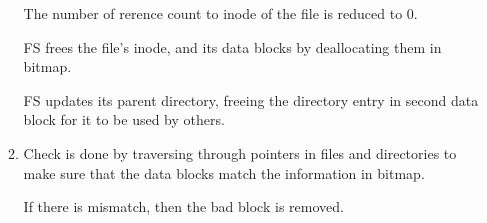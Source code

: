 \documentclass[12pt]{article}
\begin{document}
\begin{enumerate}[1.]
\begin{enumerate}[1)]
        The number of rerence count to inode of the file is reduced to 0.

        \bigskip

        FS frees the file's inode, and its data blocks by deallocating them in bitmap.

        \bigskip

        FS updates its parent directory, freeing the directory entry in second data block
        for it to be used by others.

        \item

        Check is done by traversing through pointers in files and directories to
        make sure that the data blocks match the information in bitmap.

        \bigskip

        If there is mismatch, then the bad block is removed.

    \end{enumerate}


\end{enumerate}
\end{document}
